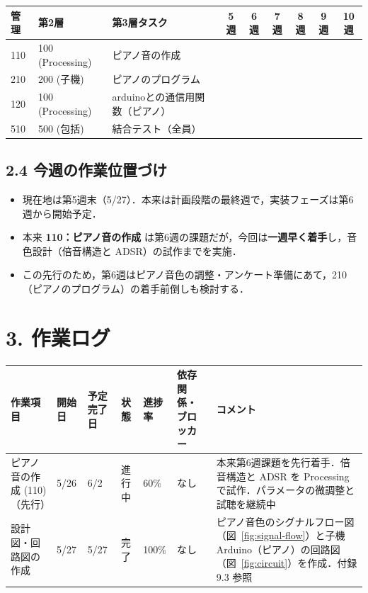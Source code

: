 \documentclass[a4paper,11pt]{ltjsarticle}
\providecommand{\％}{\%}
\begin{document}
\begin{longtable}{|p{0.9cm}|p{2.0cm}|p{6.0cm}|c|c|c|c|c|c|}
\hline
\rowcolor[gray]{0.9}
管理 & 第2層 & 第3層タスク & 5週 & 6週 & 7週 & 8週 & 9週 & 10週 \\
\hline
110 & 100 (Processing) & ピアノ音の作成 & \cellcolor{ganttCell} & \cellcolor{ganttCell} & & & & \\
\hline
210 & 200 (子機) & ピアノのプログラム & & & \cellcolor{ganttCell} & & & \\
\hline
120 & 100 (Processing) & arduinoとの通信用関数（ピアノ） & & & & \cellcolor{ganttCell} & \cellcolor{ganttCell} & \\
\hline
510 & 500 (包括) & 結合テスト（全員） & & & & & & \cellcolor{ganttCell} \\
\hline
\end{longtable}

\subsection*{2.4 今週の作業位置づけ}

\begin{itemize}
    \item 現在地は第5週末（5/27）．本来は計画段階の最終週で，実装フェーズは第6週から開始予定．
    \item 本来 \textbf{110：ピアノ音の作成} は第6週の課題だが，今回は\textbf{一週早く着手}し，音色設計（倍音構造と ADSR）の試作までを実施．
    \item この先行のため，第6週はピアノ音色の調整・アンケート準備にあて，210（ピアノのプログラム）の着手前倒しも検討する．
\end{itemize}

\section{3. 作業ログ}

\renewcommand{\arraystretch}{1.4}

\begin{longtable}{|p{2.4cm}|p{1.4cm}|p{1.6cm}|p{1.6cm}|p{1cm}|p{2.6cm}|p{3.2cm}|}
\hline
\rowcolor[gray]{0.9}
作業項目 & 開始日 & 予定完了日 & 状態 & 進捗率 & 依存関係・ブロッカー & コメント \\
\hline
ピアノ音の作成 (110)（先行） & 5/26 & 6/2 & 進行中 & 60\％ & なし & 本来第6週課題を先行着手．倍音構造と ADSR を Processing で試作．パラメータの微調整と試聴を継続中 \\
\hline
設計図・回路図の作成 & 5/27 & 5/27 & 完了 & 100\％ & なし & ピアノ音色のシグナルフロー図（図~\ref{fig:signal-flow}）と子機 Arduino（ピアノ）の回路図（図~\ref{fig:circuit}）を作成．付録 9.3 参照 \\
\hline
\end{longtable}
\end{document}
